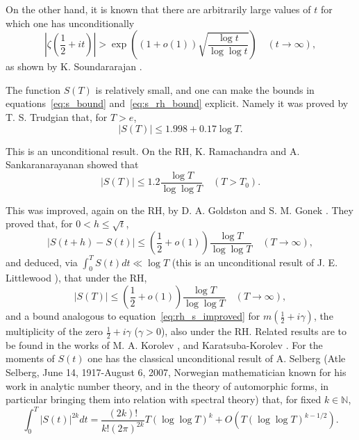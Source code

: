 \documentclass[11pt]{article}
\begin{document}
On the other hand, it is known that there are arbitrarily large values of $t$ for which one has unconditionally
\begin{equation}\label{eq:lower_bound_zeta}
\left|\zeta\left(\frac{1}{2} + it\right)\right| > \exp\left((1 + o(1))\sqrt{\frac{\log t}{\log \log t}}\right) \quad (t \to \infty),
\end{equation}
as shown by K. Soundararajan \cite{Sou3}.

The function $S(T)$ is relatively small, and one can make the bounds in equations~\eqref{eq:s_bound} and~\eqref{eq:s_rh_bound} explicit. Namely it was proved by T. S. Trudgian \cite{Tru3} that, for $T > e$,
\begin{equation}\label{eq:trudgian_s_bound}
|S(T)| \leq 1.998 + 0.17 \log T.
\end{equation}

This is an unconditional result. On the RH, K. Ramachandra and A. Sankaranarayanan \cite{RaSa2} showed that
\begin{equation}\label{eq:rh_s_bound}
|S(T)| \leq 1.2 \frac{\log T}{\log \log T} \quad (T > T_0).
\end{equation}

This was improved, again on the RH, by D. A. Goldston and S. M. Gonek \cite{GoGo}. They proved that, for $0 < h \leq \sqrt{t}$,
\begin{equation}\label{eq:goldston_gonek}
|S(t+h) - S(t)| \leq \left(\frac{1}{2} + o(1)\right) \frac{\log T}{\log \log T} \quad (T \to \infty),
\end{equation}
and deduced, via $\int_0^T S(t) dt \ll \log T$ (this is an unconditional result of J. E. Littlewood \cite{Lit}), that under the RH,
\begin{equation}\label{eq:rh_s_improved}
|S(T)| \leq \left(\frac{1}{2} + o(1)\right) \frac{\log T}{\log \log T} \quad (T \to \infty),
\end{equation}
and a bound analogous to equation~\eqref{eq:rh_s_improved} for $m(\frac{1}{2} + i\gamma)$, the multiplicity of the zero $\frac{1}{2} + i\gamma$ ($\gamma > 0$), also under the RH. Related results are to be found in the works of M. A. Korolev \cite{Kor1}, \cite{Kor2} and Karatsuba-Korolev \cite{KaKo}. For the moments of $S(t)$ one has the classical unconditional result of A. Selberg \cite{Sel} (Atle Selberg, June 14, 1917-August 6, 2007, Norwegian mathematician known for his work in analytic number theory, and in the theory of automorphic forms, in particular bringing them into relation with spectral theory) that, for fixed $k \in \mathbb{N}$,
\begin{equation}\label{eq:selberg_moments}
\int_0^T |S(t)|^{2k} dt = \frac{(2k)!}{k!(2\pi)^{2k}} T (\log \log T)^k + O(T (\log \log T)^{k-1/2}).
\end{equation}
\end{document}
